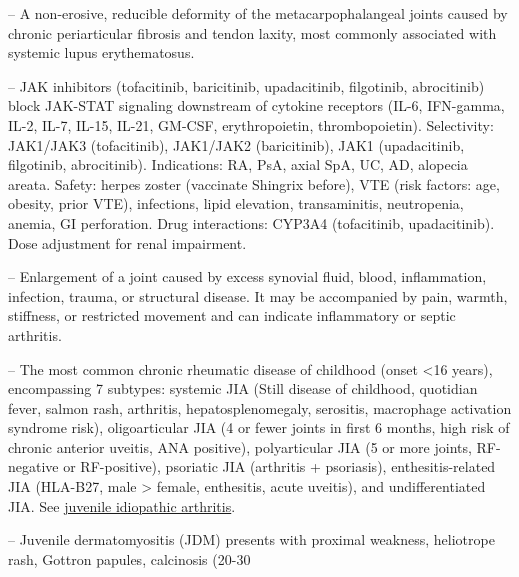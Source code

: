 -- A non-erosive, reducible deformity of the metacarpophalangeal joints caused by chronic periarticular fibrosis and tendon laxity, most commonly associated with systemic lupus erythematosus.

-- JAK inhibitors (tofacitinib, baricitinib, upadacitinib, filgotinib, abrocitinib) block JAK-STAT signaling downstream of cytokine receptors (IL-6, IFN-gamma, IL-2, IL-7, IL-15, IL-21, GM-CSF, erythropoietin, thrombopoietin). Selectivity: JAK1/JAK3 (tofacitinib), JAK1/JAK2 (baricitinib), JAK1 (upadacitinib, filgotinib, abrocitinib). Indications: RA, PsA, axial SpA, UC, AD, alopecia areata. Safety: herpes zoster (vaccinate Shingrix before), VTE (risk factors: age, obesity, prior VTE), infections, lipid elevation, transaminitis, neutropenia, anemia, GI perforation. Drug interactions: CYP3A4 (tofacitinib, upadacitinib). Dose adjustment for renal impairment.

-- Enlargement of a joint caused by excess synovial fluid, blood, inflammation, infection, trauma, or structural disease. It may be accompanied by pain, warmth, stiffness, or restricted movement and can indicate inflammatory or septic arthritis.

-- The most common chronic rheumatic disease of childhood (onset <16 years), encompassing 7 subtypes: systemic JIA (Still disease of childhood, quotidian fever, salmon rash, arthritis, hepatosplenomegaly, serositis, macrophage activation syndrome risk), oligoarticular JIA (4 or fewer joints in first 6 months, high risk of chronic anterior uveitis, ANA positive), polyarticular JIA (5 or more joints, RF-negative or RF-positive), psoriatic JIA (arthritis + psoriasis), enthesitis-related JIA (HLA-B27, male > female, enthesitis, acute uveitis), and undifferentiated JIA. See \hyperlink{Juvenile Idiopathic Arthritis}{juvenile idiopathic arthritis}.

-- Juvenile dermatomyositis (JDM) presents with proximal weakness, heliotrope rash, Gottron papules, calcinosis (20-30%

